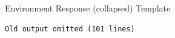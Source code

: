{
\captionsetup{type=figure}
\begin{promptbox}{Environment Response (collapsed) Template}
\begin{verbatim}
Old output omitted (101 lines)
\end{verbatim}
\end{promptbox}
\label{fig.prompts.collapsed_obs}
}